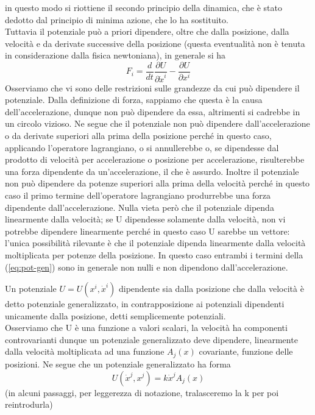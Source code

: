 \documentclass[
10pt, %
a4paper, %
oneside, %
headinclude,footinclude, %
BCOR5mm, %
]{scrartcl}
\begin{document}
in questo modo si riottiene il secondo principio della dinamica, che è stato dedotto dal principio di minima azione, che lo ha sostituito.\\
Tuttavia il potenziale può a priori dipendere, oltre che dalla posizione, dalla velocità e da derivate successive della posizione (questa eventualità non è tenuta in considerazione dalla fisica newtoniana), in generale si ha
\[F_i = \frac{d}{dt}\frac{\partial U}{\partial \dot{x}^i}-\frac{\partial U}{\partial x^i}\]
Osserviamo che vi sono delle restrizioni sulle grandezze da cui può dipendere il potenziale. Dalla definizione di forza, sappiamo che questa è la causa dell'accelerazione, dunque non può dipendere da essa, altrimenti si cadrebbe in un circolo vizioso. Ne segue che il potenziale non può dipendere dall'accelerazione o da derivate superiori alla prima della posizione perché in questo caso, applicando l'operatore lagrangiano, o si annullerebbe o, se dipendesse dal prodotto di velocità per accelerazione o posizione per accelerazione, risulterebbe una forza dipendente da un'accelerazione, il che è assurdo. Inoltre il potenziale non può dipendere da potenze superiori alla prima della velocità perché in questo caso il primo termine dell'operatore lagrangiano produrrebbe una forza dipendente dall'accelerazione. Nulla vieta però che il potenziale dipenda linearmente dalla velocità; se U dipendesse solamente dalla velocità, non vi potrebbe dipendere linearmente perché in questo caso U sarebbe un vettore: l'unica possibilità rilevante è che il potenziale dipenda linearmente dalla velocità moltiplicata per potenze della posizione. In questo caso entrambi i termini della (\ref{eq:pot-gen}) sono in generale non nulli e non dipendono dall'accelerazione.
\begin{definizione}
	Un potenziale \( U = U(x^i, \dot{x}^i)\) dipendente sia dalla posizione che dalla velocità è detto potenziale generalizzato, in contrapposizione ai potenziali dipendenti unicamente dalla posizione, detti semplicemente potenziali. \\
	Osserviamo che U è una funzione a valori scalari, la velocità ha componenti controvarianti dunque un potenziale generalizzato deve dipendere, linearmente dalla velocità moltiplicata ad una funzione \(A_j(x)\) covariante, funzione delle posizioni. Ne segue che un potenziale generalizzato ha forma
	\[U(\dot{x}^j, x^j) = k\dot{x}^jA_j(x)\]
	(in alcuni passaggi, per leggerezza di notazione, tralasceremo la k per poi reintrodurla)
\end{definizione}
\end{document}
